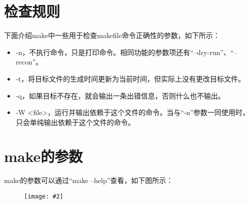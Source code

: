 \documentclass[a4paper,left=2.5cm,right=2.5cm,11pt]{article}
\newcommand{\sizedfic}[2]{\begin{figure}[H]
		\center
		\texttt{[image: \#2]}
	\end{figure}}
\begin{document}
\section{检查规则}
	下面介绍make中一些用于检查makefile命令正确性的参数，如下所示：
	\begin{itemize}
		\item -n，不执行命令，只是打印命令。相同功能的参数项还有“--dry-run”、“--recon”。
		\item -t，将目标文件的生成时间更新为当前时间，但实际上没有更改目标文件。
		\item -q，如果目标不存在，就会输出一条出错信息，否则什么也不输出。
		\item -W <file>，运行并输出依赖于这个文件的命令。当与“-n”参数一同使用时，只会单纯输出依赖于这个文件的命令。
	\end{itemize}

\section{make的参数}
	make的参数可以通过“make --help”查看，如下图所示：
	\sizedfic{0.85}{1.png}
  
\end{document}
